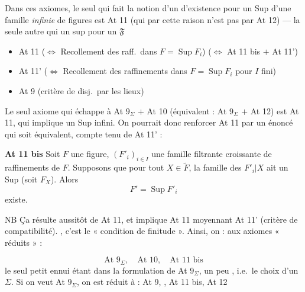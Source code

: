 \documentclass[11pt,a4paper]{article}
\begin{document}
Dans ces axiomes, le seul qui fait \ill{} la notion d'un \struck{\ill{}}  d'existence pour un \struck{\ill{}} Sup d'une famille \emph{infinie} de figures  est At 11 (qui par cette raison n'est pas \ill{} par At 12) --- la seule autre qui \ill{} \ill{} \ill{} un sup pour un $\mathfrak{F}$

\begin{itemize}
  \item At 11 ($\Longleftrightarrow$ Recollement des raff.\ dans $F = \operatorname{Sup} F_i$) ($\Longleftrightarrow$ At 11 bis $+$ At 11')
  \item At 11' ($\Longleftrightarrow$ Recollement des raffinements dans $F = \operatorname{Sup} F_i$ pour $I$ fini)
  \item At 9 (critère de disj.\ par les lieux)
\end{itemize}

Le seul axiome qui échappe à At $9_{\Sigma}$ $+$ At 10 (équivalent : At $9_{\Sigma}$ $+$ At 12) est At 11, qui implique un Sup infini. On pourrait donc renforcer At 11 par un énoncé \struck{\ill{}} qui soit équivalent, compte tenu de At 11' :

\textbf{At 11 bis} Soit $F$ une figure, $(F'_i)_{i \in I}$ une famille filtrante croissante de raffinements de $F$. Supposons que pour tout $X \in \widetilde{F}$, la famille des $F'_i | X$ \struck{\ill{}} ait un Sup (soit $F_X$). Alors
\[
  F' = \operatorname{Sup} F'_i
\]
existe.

NB Ça résulte aussitôt de At 11, et \ill{} implique At 11 moyennant At 11' (critère de compatibilité).  \ill{} \ill{} , c'est \ill{} le \ill{} « condition de  finitude ». Ainsi, on \ill{} : \ill{} aux axiomes « réduits » :

\[
  \text{At } 9_{\Sigma}, \quad \text{At } 10, \quad \text{At } 11 \text{ bis}
\]
le seul petit ennui étant dans la formulation de At $9_{\Sigma}$, un peu \ill{}, i.e.\ le choix d'un $\Sigma$. Si on veut \ill{} At $9_{\Sigma}$, on est réduit à  : At 9, \struck{\ill{}}, At 11 bis, At 12
\end{document}
